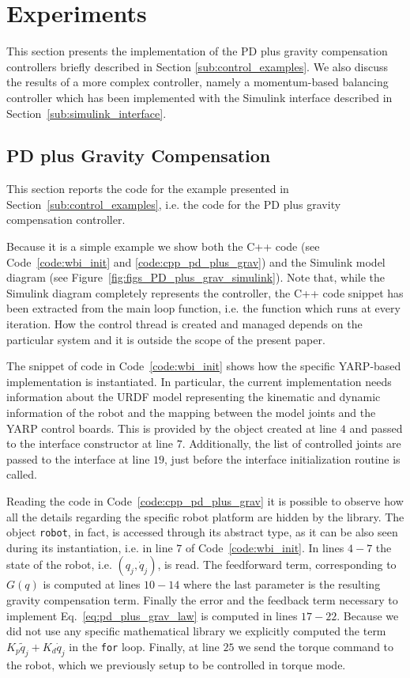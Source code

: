 \section{Experiments}
\label{sec:experiments}

This section presents the implementation of the PD plus gravity compensation controllers briefly described in Section \ref{sub:control_examples}. 
We also discuss the results of a more complex controller, namely a momentum-based balancing controller which has been implemented with the Simulink interface described in Section~\ref{sub:simulink_interface}.

\subsection{PD plus Gravity Compensation} %
\label{sub:pd_plus_gravity_compensation}

This section reports the code for the  example presented in Section~\ref{sub:control_examples}, i.e. the code for the PD plus gravity compensation controller.

Because it is a simple example we show both the C++ code (see Code~\ref{code:wbi_init} and \ref{code:cpp_pd_plus_grav}) and the Simulink model diagram (see Figure~\ref{fig:figs_PD_plus_grav_simulink}).
Note that, while the Simulink diagram completely represents the controller, the C++ code snippet has been extracted from the main loop function, i.e. the function which runs at every iteration. 
How the control thread is created and managed depends on the particular system and it is outside the scope of the present paper.

The snippet of code in Code~\ref{code:wbi_init} shows how the specific YARP-based implementation is instantiated. 
In particular, the current implementation needs information about the URDF model representing the kinematic and dynamic information of the robot and the mapping between the model joints and the YARP control boards. This is provided by the object created at line $4$ and passed to the interface constructor at line $7$.
Additionally, the list of controlled joints are passed to the interface at line $19$, just before the interface initialization routine is called.

Reading the code in Code~\ref{code:cpp_pd_plus_grav} it is possible to observe how all the details regarding the specific robot platform are hidden by the library.
The object {\tt robot}, in fact, is accessed through its abstract type, as it can be also seen during its instantiation, i.e. in line $7$ of Code~\ref{code:wbi_init}.
In lines $4-7$ the state of the robot, i.e. $(q_j, \dot{q}_j)$, is read.
The feedforward term, corresponding to $G(q)$ is computed at lines $10 - 14$ where the last parameter is the resulting gravity compensation term.
Finally the error and the feedback term necessary to implement Eq.~\eqref{eq:pd_plus_grav_law} is computed in lines $17-22$. 
Because we did not use any specific mathematical library we explicitly computed the term $K_p \tilde{q}_j + K_d \dot{q}_j$ in the {\tt for} loop.
Finally, at line $25$ we send the torque command to the robot, which we previously setup to be controlled in torque mode.

